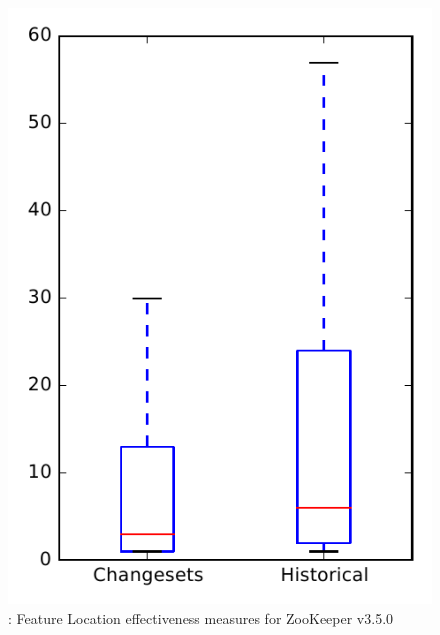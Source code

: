 
\begin{figure}
\centering
\includegraphics[height=0.4\textheight]{figures/flt/rq2_zookeeper_no_outlier}
\caption{\ftwo: Feature Location effectiveness measures for ZooKeeper v3.5.0}
\label{fig:flt:rq2:zookeeper}
\end{figure}
